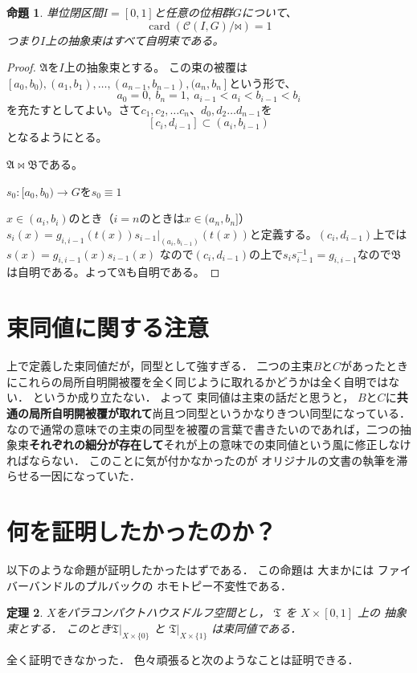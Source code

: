 \documentclass[leqno]{jsarticle}
\newtheorem{thm}{定理}
\newtheorem{prop}[thm]{命題}
\begin{document}
\begin{prop}
単位閉区間$I=[0,1]$と任意の位相群$G$について、
\[
\operatorname{card}\left(\mathscr{C}(I,G)/\!\mathord{\bowtie}\right)=1
\]
つまり$I$上の抽象束はすべて自明束である。
\end{prop}
\begin{proof}
$\mathfrak{A}$を$I$上の抽象束とする。
この束の被覆は$[a_0, b_0), (a_1, b_1), \dots , (a_{n-1}, b_{n-1}), (a_n, b_n]$という形で、
\[
a_0=0,\  b_n=1, \ a_{i-1}<a_i<b_{i-1}<b_i
\]
を充たすとしてよい。さて$c_1, c_2,\dots c_n$、$d_0, d_2\dots d_{n-1}$を
\[
[c_i, d_{i-1}]\subset (a_i, b_{i-1})
\]
となるようにとる。

$\mathfrak{A}\bowtie \mathfrak{B}$である。


$s_0:[a_0, b_0)\to G$を$s_0\equiv 1$

$x\in (a_i, b_i)$のとき（$i=n$のときは$x\in (a_n, b_n]$）
$s_i(x)=g_{i,i-1}(t(x))s_{i-1}|_{(a_i,b_{i-1})}(t(x))$と定義する。$(c_i, d_{i-1})$上では$s(x)=g_{i,i-1}(x)s_{i-1}(x)$
なので$(c_i, d_{i-1})$の上で$s_{i}s_{i-1}^{-1}=g_{i,i-1}$なので$\mathfrak{B}$は自明である。よって$\mathfrak{A}$も自明である。
\end{proof}

\section{束同値に関する注意}
上で定義した束同値だが，同型として強すぎる．
二つの主束$B$と$C$があったときにこれらの局所自明開被覆を全く同じように取れるかどうかは全く自明ではない．
というか成り立たない．
よって
束同値は主束の話だと思うと，
$B$と$C$に\textbf{共通の局所自明開被覆が取れて}尚且つ同型というかなりきつい同型になっている．
なので通常の意味での主束の同型を被覆の言葉で書きたいのであれば，二つの抽象束\textbf{それぞれの細分が存在して}それが上の意味での束同値という風に修正しなければならない．
このことに気が付かなかったのが
オリジナルの文書の執筆を滞らせる一因になっていた．


\section{何を証明したかったのか？}
以下のような命題が証明したかったはずである．
この命題は
大まかには
ファイバーバンドルのプルバックの
ホモトピー不変性である．
\begin{thm}\label{thm:8888}
$X$をパラコンパクトハウスドルフ空間とし，
$\mathfrak{T}$
を
$X\times [0, 1]$
上の
抽象束とする．
このとき$\mathfrak{T}|_{X\times \{0\}}$
と
$\mathfrak{T}|_{X\times\{1\}}$
は束同値である．
\end{thm}
全く証明できなかった．
色々頑張ると次のようなことは証明できる．
\end{document}
